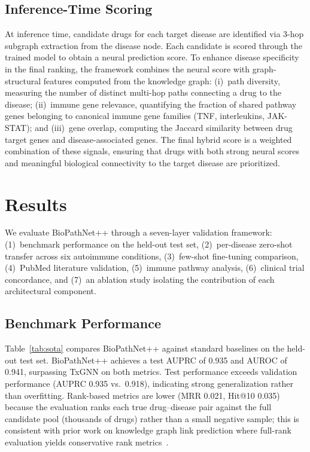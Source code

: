 \documentclass[conference]{IEEEtran}
\begin{document}
\subsection{Inference-Time Scoring}

At inference time, candidate drugs for each target disease are identified via 3-hop subgraph extraction from the disease node. Each candidate is scored through the trained model to obtain a neural prediction score. To enhance disease specificity in the final ranking, the framework combines the neural score with graph-structural features computed from the knowledge graph: (i)~path diversity, measuring the number of distinct multi-hop paths connecting a drug to the disease; (ii)~immune gene relevance, quantifying the fraction of shared pathway genes belonging to canonical immune gene families (TNF, interleukins, JAK-STAT); and (iii)~gene overlap, computing the Jaccard similarity between drug target genes and disease-associated genes. The final hybrid score is a weighted combination of these signals, ensuring that drugs with both strong neural scores and meaningful biological connectivity to the target disease are prioritized.

\section{Results}

We evaluate BioPathNet++ through a seven-layer validation framework: (1)~benchmark performance on the held-out test set, (2)~per-disease zero-shot transfer across six autoimmune conditions, (3)~few-shot fine-tuning comparison, (4)~PubMed literature validation, (5)~immune pathway analysis, (6)~clinical trial concordance, and (7)~an ablation study isolating the contribution of each architectural component.

\subsection{Benchmark Performance}

Table~\ref{tab:sota} compares BioPathNet++ against standard baselines on the held-out test set. BioPathNet++ achieves a test AUPRC of 0.935 and AUROC of 0.941, surpassing TxGNN on both metrics. Test performance exceeds validation performance (AUPRC 0.935 vs.\ 0.918), indicating strong generalization rather than overfitting. Rank-based metrics are lower (MRR 0.021, Hit@10 0.035) because the evaluation ranks each true drug--disease pair against the full candidate pool (thousands of drugs) rather than a small negative sample; this is consistent with prior work on knowledge graph link prediction where full-rank evaluation yields conservative rank metrics~\cite{nbfnet}.
\end{document}
